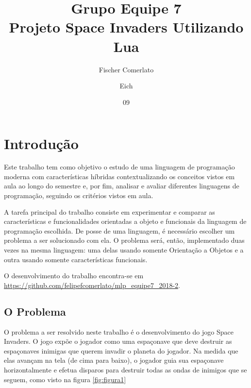 \documentclass[rel_mlp]{iiufrgs}
\title{Grupo Equipe 7 \\ Projeto Space Invaders Utilizando Lua}
\author{Fischer Comerlato}{Felipe} %
\author{Eich}{Leonardo} %
\date{09}{2018}
\begin{document}
\maketitle      


\tableofcontents








%
\chapter{Introdução} \label{intro}

Este trabalho tem como objetivo o estudo de uma linguagem de programação moderna com características híbridas contextualizando os conceitos vistos em aula ao longo do semestre e, por fim, analisar e avaliar diferentes linguagens de programação, seguindo os critérios vistos em aula.

A tarefa principal do trabalho consiste em experimentar e comparar as características e funcionalidades orientadas a objeto e funcionais da linguagem de programação escolhida. De posse de uma linguagem, é necessário escolher um problema a ser solucionado com ela. O problema será, então, implementado duas vezes na mesma linguagem: uma delas usando somente Orientação a Objetos e a outra usando somente características funcionais.

O desenvolvimento do trabalho encontra-se em \url{https://github.com/felipefcomerlato/mlp_equipe7_2018-2}.


\section{O Problema}
O problema a ser resolvido neste trabalho é o desenvolvimento do jogo Space Invaders. O jogo expõe o jogador como uma espaçonave que deve destruir as espaçonaves inimigas que querem invadir o planeta do jogador. Na medida que elas avançam na tela (de cima para baixo), o jogador guia sua espaçonave horizontalmente e efetua disparos para destruir todas as ondas de inimigos que se seguem, como visto na figura \ref{fig:figura1}
\end{document}
